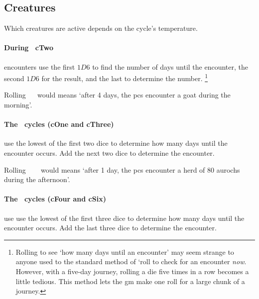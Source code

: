 \begin{multicols}{2}

\subsection{Creatures}

Which creatures are active depends on the \gls{cycle}'s temperature.

\toggletrue{genExamples}
\setcounter{enc}{19}
\begin{boxtable}[rXc]
\end{boxtable}

\setcounter{temperature}{0}
\paragraph{During \showTemperature\ \gls{cTwo}}
encounters use the first $1D6$ to find the number of days until the encounter, the second $1D6$ for the result, and the last to determine the number.%
\footnote{Rolling to see `how many days until an encounter' may seem strange to anyone used to the standard method of `roll to check for an encounter \emph{now}.
However, with a five-day journey, rolling a die five times in a row becomes a little tedious.
This method lets the \gls{gm} make one roll for a large chunk of a journey.}

Rolling ~~ would means `after 4 days, the \glspl{pc} encounter a goat during the morning'.

\paragraph{The \showTemperature\ \glspl{cycle} (\gls{cOne} and \gls{cThree})}
use the lowest of the first two dice to determine how many days until the encounter occurs.
Add the next two dice to determine the encounter.

Rolling ~~~ would means `after 1 day, the \glspl{pc} encounter a herd of 80 aurochs during the afternoon'.

\paragraph{The \showTemperature\ \glspl{cycle} (\gls{cFour} and \gls{cSix})}
use use the lowest of the first three dice to determine how many days until the encounter occurs.
Add the last three dice to determine the encounter.


\end{multicols}

